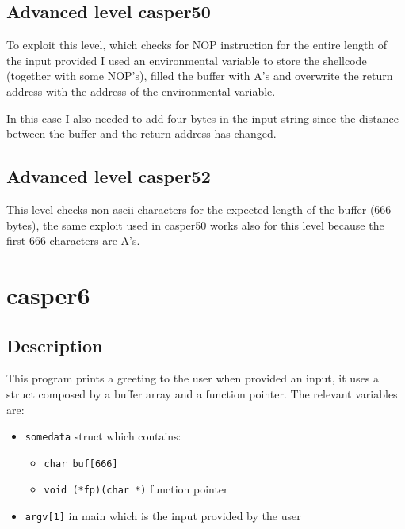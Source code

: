 \documentclass[a4paper,12pt]{article}
\begin{document}
\subsection{Advanced level casper50}

To exploit this level, which checks for NOP instruction for the entire length of the input provided I used an environmental variable to store the shellcode (together with some NOP's), filled the buffer with A's and overwrite the return address with the address of the environmental variable.

In this case I also needed to add four bytes in the input string since the distance between the buffer and the return address has changed.

\subsection{Advanced level casper52}

This level checks non ascii characters for the expected length of the buffer (666 bytes), the same exploit used in casper50 works also for this level because the first 666 characters are A's.

\section{casper6}


\subsection{Description}

This program prints a greeting to the user when provided an input, it uses a struct composed by a buffer array and a function pointer. The relevant variables are:
\begin{itemize}

\item \texttt{somedata} struct which contains:
		\begin{itemize}
		\item \texttt{char buf[666]}
		\item \texttt{void (*fp)(char *)} function pointer
		\end{itemize}
\item \texttt{argv[1]} in main which is the input provided by the user
\end{itemize}
\end{document}
